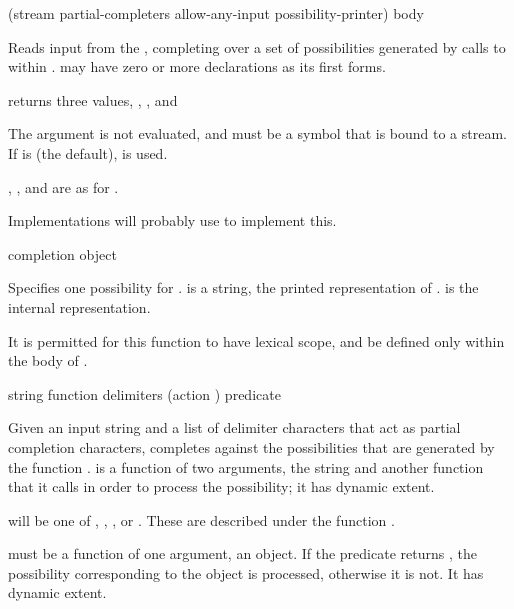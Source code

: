  {(stream
                                          \key partial-completers allow-any-input possibility-printer) 
                                         \body body}  

Reads input from the  , completing over a
set of possibilities generated by calls to  within .
 may have zero or more declarations as its first forms.

 returns three values, ,
, and 

The  argument is not evaluated, and must be a symbol that is bound
to a stream.  If  is  (the default),  is used.

, , and 
are as for .

Implementations will probably use  to implement
this.

 {completion object}

Specifies one possibility for .  
is a string, the printed representation of .   is the
internal representation.

It is permitted for this function to have lexical scope, and be defined only
within the body of .


 {string function delimiters
                                  \key (action ) predicate}

Given an input string  and a list of delimiter characters
 that act as partial completion characters,
 completes against the possibilities that are
generated by the function .   is a function of two
arguments, the string  and another function that it calls in order
to process the possibility; it has dynamic extent.

 will be one of , ,
, or .  These are described under the
function .

 must be a function of one argument, an object.  If the predicate
returns , the possibility corresponding to the object is processed,
otherwise it is not.  It has dynamic extent.

